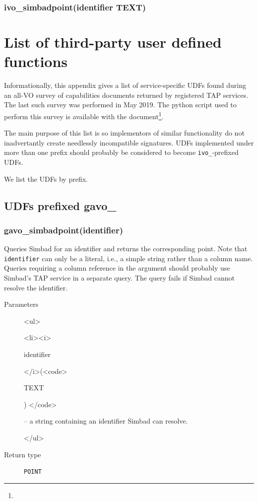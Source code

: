 \documentclass[11pt,a4paper]{ivoa}
\newenvironment{args}%
{\begin{html}<ul>\end{html}\def\arg##1(##2){\begin{html}<li><i>\end{html}%
  ##1 \begin{html}</i>(<code>\end{html}##2\begin{html}) </code>\end{html}}}%
{\begin{html}</ul>\end{html}}
\begin{document}
\subsubsection{ivo\_simbadpoint(identifier TEXT)}


\appendix

\section{List of third-party user defined functions}
\label{app:otherudfs}

Informationally, this appendix gives a list of service-specific UDFs
found during an all-VO survey of capabilities documents returned by
registered TAP services.  The last such survey was performed in May
2019.  The python script used to perform this survey is available
with the document\footnote{}.

The main purpose of this list is so implementors of similar
functionality do not inadvertantly create needlessly incompatible
signatures.  UDFs implemented under more than one prefix should probably
be considered to become \verb|ivo_|-prefixed UDFs.

We list the UDFs by prefix.

\subsection{UDFs prefixed gavo\_}

\subsubsection{gavo\_simbadpoint(identifier)}

Queries Simbad for an identifier and returns the corresponding point.
Note that \texttt{identifier} can only be a literal, i.e., a simple string
rather than a column name.  Queries requiring a column reference in the
argument should probably use Simbad's TAP service in a separate query.
The query fails if Simbad cannot resolve the identifier.

\begin{description}
\item[Parameters]
\begin{args}
	\arg identifier (TEXT) -- a string containing an identifier Simbad can
	resolve.
\end{args}

\item[Return type] \texttt{POINT}
\end{description}
\end{document}
